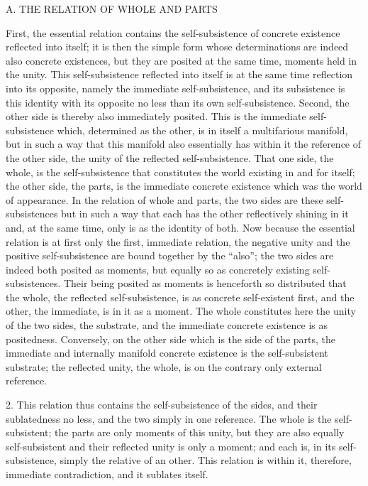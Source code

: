 A. THE RELATION OF WHOLE AND PARTS

First, the essential relation contains the self-subsistence
of concrete existence reflected into itself;
it is then the simple form whose determinations are
indeed also concrete existences,
but they are posited at the same time,
moments held in the unity.
This self-subsistence reflected into itself is
at the same time reflection into its opposite,
namely the immediate self-subsistence,
and its subsistence is this identity with its opposite
no less than its own self-subsistence.
Second, the other side is thereby also immediately posited.
This is the immediate self-subsistence which, determined as the other,
is in itself a multifarious manifold,
but in such a way that this manifold also essentially
has within it the reference of the other side,
the unity of the reflected self-subsistence.
That one side, the whole, is the self-subsistence
that constitutes the world existing in and for itself;
the other side, the parts,
is the immediate concrete existence which was the world of appearance.
In the relation of whole and parts, the two sides are these self-subsistences
but in such a way that each has the other reflectively shining in it and, at
the same time, only is as the identity of both.
Now because the essential relation is at first only the first,
immediate relation, the negative unity and
the positive self-subsistence are bound together by the “also”;
the two sides are indeed both posited as moments,
but equally so as concretely existing self-subsistences.
Their being posited as moments is henceforth so distributed
that the whole, the reflected self-subsistence, is
as concrete self-existent first, and the other,
the immediate, is in it as a moment.
The whole constitutes here the unity of the two sides, the substrate,
and the immediate concrete existence is as positedness.
Conversely, on the other side which is the side of the parts,
the immediate and internally manifold concrete existence is
the self-subsistent substrate;
the reflected unity, the whole, is on the contrary only external reference.

2. This relation thus contains the self-subsistence of the sides,
and their sublatedness no less, and the two simply in one reference.
The whole is the self-subsistent; the parts are only moments of this unity,
but they are also equally self-subsistent
and their reflected unity is only a moment;
and each is, in its self-subsistence, simply the relative of an other.
This relation is within it, therefore, immediate contradiction,
and it sublates itself.

